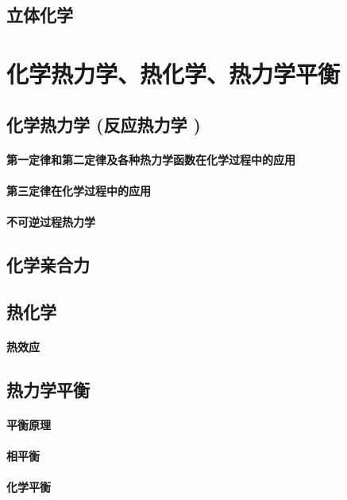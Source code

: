 \documentclass[UTF8]{../03-Chemistry}
\begin{document}
\section{立体化学}






\chapter{化学热力学、热化学、热力学平衡}
\section{化学热力学 (反应热力学 )}
    \subsubsection{第一定律和第二定律及各种热力学函数在化学过程中的应用}
    \subsubsection{第三定律在化学过程中的应用}
    \subsubsection{不可逆过程热力学}
\section{化学亲合力}
\section{热化学}
    \subsubsection{热效应}
\section{热力学平衡}
    \subsubsection{平衡原理}
    \subsubsection{相平衡}
    \subsubsection{化学平衡}
\end{document}

